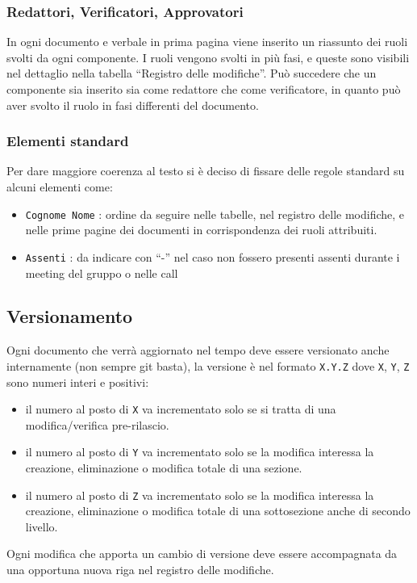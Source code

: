 \subsubsection{Redattori, Verificatori, Approvatori}
In ogni documento e verbale in prima pagina viene inserito un riassunto dei ruoli svolti da ogni componente. I ruoli vengono svolti in più fasi, e queste sono visibili nel dettaglio nella tabella ``Registro delle modifiche''. Può succedere che un componente sia inserito sia come redattore che come verificatore, in quanto può aver svolto il ruolo in fasi differenti del documento.


\subsubsection{Elementi standard}
Per dare maggiore coerenza al testo si è deciso di fissare delle regole standard su alcuni elementi come:
\begin{itemize}
	\item \texttt{Cognome Nome} : ordine da seguire nelle tabelle, nel registro delle modifiche, e nelle prime pagine dei documenti in corrispondenza dei ruoli attribuiti.
	\item \texttt{Assenti} : da indicare con ``-'' nel caso non fossero presenti assenti durante i meeting del gruppo o nelle call
\end{itemize}

\subsection{Versionamento}
Ogni documento che verrà aggiornato nel tempo deve essere versionato anche
internamente (non sempre git basta), la versione è nel formato \texttt{X.Y.Z} dove
\texttt{X}, \texttt{Y}, \texttt{Z} sono numeri interi e positivi:
\begin{itemize}
    \item il numero al posto di \texttt{X} va incrementato solo se si tratta di una
    modifica/verifica pre-rilascio.
    \item il numero al posto di \texttt{Y} va incrementato solo se la modifica
    interessa la creazione, eliminazione o modifica totale di una sezione.
    \item il numero al posto di \texttt{Z} va incrementato solo se la modifica
    interessa la creazione, eliminazione o modifica totale di una sottosezione
    anche di secondo livello.
\end{itemize}
Ogni modifica che apporta un cambio di versione deve essere accompagnata da una
opportuna nuova riga nel registro delle modifiche.
\\

